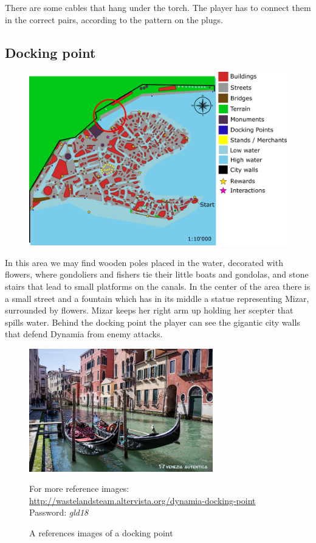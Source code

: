 There are some cables that hang under the torch. The player has to connect them in the correct pairs, according to the pattern on the plugs.

\subsection{Docking point}
\begin{figure}[H]
    \centering
    \includegraphics[width=12cm]{Images/Maps/dockingPoint}
  \end{figure}
  
In this area we may find wooden poles placed in the water, decorated with flowers, where gondoliers and fishers tie their little boats and gondolas, and  stone stairs that lead to small platforms on the canals. 
In the center of the area there is a small street and a fountain which has in its middle a statue representing Mizar, surrounded by flowers. Mizar keeps her right arm up holding her scepter that spills water.
Behind the docking point the player can see the gigantic city walls that defend Dynamia from enemy attacks.
\begin{figure}[H]
    \centering
    \includegraphics[width=8cm]{Images/Landmarks/dockingPoint}
    \caption{A references images of a docking point}
    For more reference images: \href{http://wastelandsteam.altervista.org/dynamia-docking-point}{http://wastelandsteam.altervista.org/dynamia-docking-point}\\Password: \textit{gld18}
  \end{figure}
